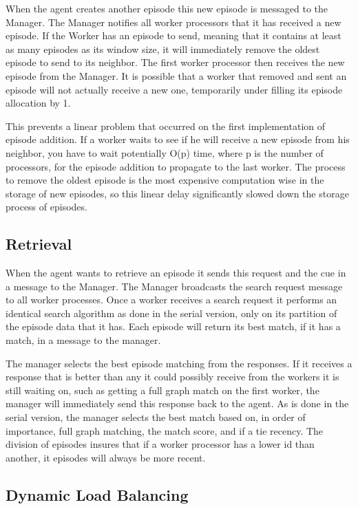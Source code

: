 \documentclass[11pt]{article} %
\begin{document}
When the agent creates another episode this new episode is messaged to the
Manager. The Manager notifies all worker processors that it has received a new
episode. If the Worker has an episode to send, meaning that it contains at least
as many episodes as its window size, it will immediately remove the oldest
episode to send to its neighbor. The first worker processor then receives the
new episode from the Manager. It is possible that a worker that removed and sent
an episode will not actually receive a new one, temporarily under filling its
episode allocation by 1.

This prevents a linear problem that occurred on the first implementation of
episode addition. If a worker waits to see if he will receive a new episode from
his neighbor, you have to wait potentially O(p) time, where p is the number of
processors, for the episode addition to propagate to the last worker. The
process to remove the oldest episode is the most expensive computation wise in
the storage of new episodes, so this linear delay significantly slowed down the
storage process of episodes.


\subsection{Retrieval}
When the agent wants to retrieve an episode it sends this request and the cue in
a message to the Manager. The Manager broadcasts the search request message to
all worker processes. Once a worker receives a search request it performs an
identical search algorithm as done in the serial version, only on its partition
of the episode data that it has. Each episode will return its best match, if it
has a match, in a message to the manager.

The manager selects the best episode matching from the responses. If it receives
a response that is better than any it could possibly receive from the workers it
is still waiting on, such as getting a full graph match on the first worker, the
manager will immediately send this response back to the agent. As is done in the
serial version, the manager selects the best match based on, in order of
importance, full graph matching, the match score, and if a tie recency. The
division of episodes insures that if a worker processor has a lower id than
another, it episodes will always be more recent.

\subsection{Dynamic Load Balancing}
\end{document}
